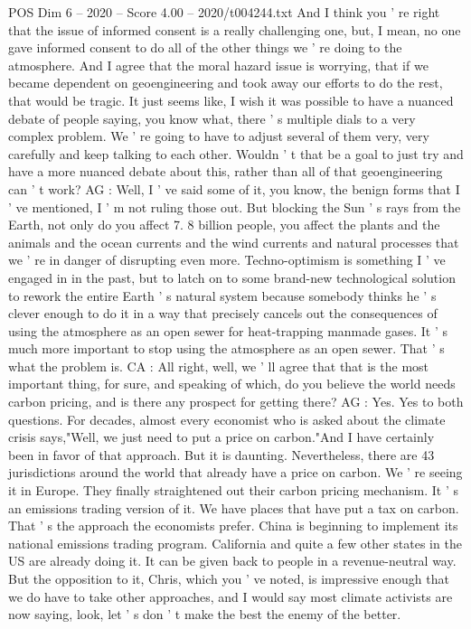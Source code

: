 \begin{textsample}{POS Dim 6 – 2020 – Score 4.00 – 2020/t004244.txt}
And I think you ' re right that the issue of informed consent is a really challenging one, but, I mean, no one gave informed consent to do all of the other things we ' re doing to the atmosphere.
And I agree that the moral hazard issue is worrying, that if we became dependent on geoengineering and took away our efforts to do the rest, that would be tragic.
It just seems like, I wish it was possible to have a nuanced debate of people saying, you know what, there ' s multiple dials to a very complex problem.
We ' re going to have to adjust several of them very, very carefully and keep talking to each other.
Wouldn ' t that be a goal to just try and have a more nuanced debate about this, rather than all of that geoengineering can ' t work?
AG : Well, I ' ve said some of it, you know, the benign forms that I ' ve mentioned, I ' m not ruling those out.
But blocking the Sun ' s rays from the Earth, not only do you affect 7. 8 billion people, you affect the plants and the animals and the ocean currents and the wind currents and natural processes that we ' re in danger of disrupting even more.
Techno-optimism is something I ' ve engaged in in the past, but to latch on to some brand-new technological solution to rework the entire Earth ' s natural system because somebody thinks he ' s clever enough to do it in a way that precisely cancels out the consequences of using the atmosphere as an open sewer for heat-trapping manmade gases.
It ' s much more important to stop using the atmosphere as an open sewer.
That ' s what the problem is.
CA : All right, well, we ' ll agree that that is the most important thing, for sure, and speaking of which, do you believe the world needs carbon pricing, and is there any prospect for getting there?
AG : Yes.
Yes to both questions.
For decades, almost every economist who is asked about the climate crisis says,"Well, we just need to put a price on carbon."And I have certainly been in favor of that approach.
But it is daunting.
Nevertheless, there are 43 jurisdictions around the world that already have a price on carbon.
We ' re seeing it in Europe.
They finally straightened out their carbon pricing mechanism.
It ' s an emissions trading version of it.
We have places that have put a tax on carbon.
That ' s the approach the economists prefer.
China is beginning to implement its national emissions trading program.
California and quite a few other states in the US are already doing it.
It can be given back to people in a revenue-neutral way.
But the opposition to it, Chris, which you ' ve noted, is impressive enough that we do have to take other approaches, and I would say most climate activists are now saying, look, let ' s don ' t make the best the enemy of the better.

\end{textsample}

